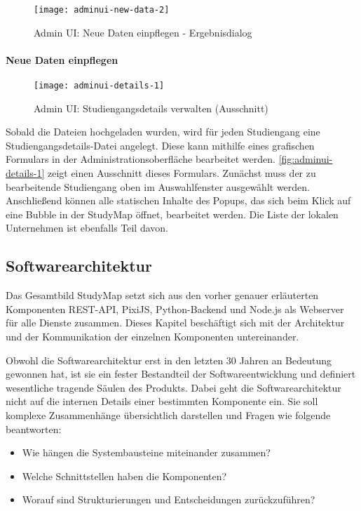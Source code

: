 \begin{figure}[H]
    \centering
    \texttt{[image: adminui-new-data-2]}
    \caption{Admin UI: Neue Daten einpflegen - Ergebnisdialog}
    \label{fig:adminui-new-data-2}
\end{figure}

\paragraph*{Neue Daten einpflegen}
\begin{figure}[H]
    \centering
    \texttt{[image: adminui-details-1]}
    \caption{Admin UI: Studiengangsdetails verwalten (Ausschnitt)}
    \label{fig:adminui-details-1}
\end{figure}

Sobald die Dateien hochgeladen wurden, wird für jeden Studiengang eine Studiengangsdetails-Datei angelegt. Diese kann mithilfe eines grafischen Formulars in der Administrationsoberfläche bearbeitet werden. \autoref{fig:adminui-details-1} zeigt einen Ausschnitt dieses Formulars. Zunächst muss der zu bearbeitende Studiengang oben im Auswahlfenster ausgewählt werden. Anschließend können alle statischen Inhalte des Popups, das sich beim Klick auf eine Bubble in der StudyMap öffnet, bearbeitet werden. Die Liste der lokalen Unternehmen ist ebenfalls Teil davon.


\newpage
\subsection{Softwarearchitektur}
Das Gesamtbild StudyMap setzt sich aus den vorher genauer erläuterten Komponenten REST-API, PixiJS, Python-Backend und Node.js als Webserver für alle Dienste zusammen. Dieses Kapitel beschäftigt sich mit der Architektur und der Kommunikation der einzelnen Komponenten untereinander.

Obwohl die Softwarearchitektur erst in den letzten 30 Jahren an Bedeutung gewonnen hat, ist sie ein fester Bestandteil der Softwareentwicklung und definiert wesentliche tragende Säulen des Produkts. Dabei geht die Softwarearchitektur nicht auf die internen Details einer bestimmten Komponente ein. \parencite{vogel_einleitung_2009} Sie soll komplexe Zusammenhänge übersichtlich darstellen und Fragen wie folgende beantworten:
\begin{itemize}
    \item Wie hängen die Systembausteine miteinander zusammen?
    \item Welche Schnittstellen haben die Komponenten?
    \item Worauf sind Strukturierungen und Entscheidungen zurückzuführen?
\end{itemize}

